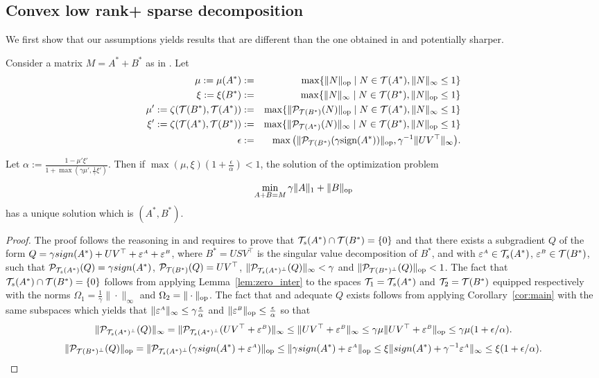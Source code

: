 \documentclass{article}
\begin{document}
\subsection{Convex low rank+ sparse decomposition}
We first show that our assumptions yields results that are different than the one obtained in \citet{chandrasekaran2011rank} and potentially sharper.
\begin{cor}
Consider a matrix $M=A^*+B^*$ as in \citet{chandrasekaran2011rank}. Let 
\begin{eqnarray*}
\mu:=\mu(A^*)&:=&\max \{ \|N\|_{{\rm op}} \mid N \in \mathcal{T}(A^*), \|N\|_{\infty} \leq 1\}\\
 \xi:=\xi(B^*)&:=&\max \{ \|N\|_{\infty} \mid N \in \mathcal{T}(B^*), \|N\|_{{\rm op}} \leq 1 \}\\
\mu':=\zeta(\mathcal{T}(B^*),\mathcal{T}(A^*))&:=&\max \{ \|\mathcal{P}_{\mathcal{T}(B^*)}(N)\|_{{\rm op}} \mid N \in \mathcal{T}(A^*), \|N\|_{\infty} \leq 1\} \\ 
\xi':=\zeta(\mathcal{T}(A^*),\mathcal{T}(B^*))&:=&\max \{ \|\mathcal{P}_{\mathcal{T}(A^*)}(N)\|_{\infty} \mid N \in \mathcal{T}(B^*), \|N\|_{{\rm op}} \leq 1 \}\\
\epsilon&:=&\max \big (\|\mathcal{P}_{\mathcal{T}(B^*)}(\gamma \text{sign}(A^*))\|_{{\rm op}}, \gamma^{-1}\|UV^\top\|_{\infty} \big ).
\end{eqnarray*}

Let $\alpha:=\frac{1-\mu'\xi'}{1+\max(\gamma \mu',\frac{1}{\gamma} \xi')}$. Then if $\max(\mu,\xi) (1+\frac{\epsilon}{\alpha})<1$, the solution of the optimization problem
$$\min_{A+B=M} \gamma \|A\|_{1}+\|B\|_{{\rm op}}$$
has a unique solution which is $(A^*,B^*)$. 
\end{cor}
\begin{proof}
The proof follows the reasoning in \citet{chandrasekaran2011rank} and requires to prove that $\mathcal{T}_s(A^*)\cap \mathcal{T}(B^*)=\{0\}$ and that there exists a subgradient $Q$ of the form $Q=\gamma sign(A^*)+UV^\top+\varepsilon^{{\scriptscriptstyle A}}+\varepsilon^{{\scriptscriptstyle B}}$, where $B^*=USV^\top$
is the singular value decomposition of $B^*$, and with $\varepsilon^{{\scriptscriptstyle A}} \in \mathcal{T}_s(A^*)$,  $\varepsilon^{{\scriptscriptstyle B}} \in \mathcal{T}(B^*)$,
such that $\mathcal{P}_{\mathcal{T}_s(A^*)}(Q)=\gamma sign(A^*)$, $\mathcal{P}_{\mathcal{T}(B^*)}(Q)=UV^\top$, $\|\mathcal{P}_{\mathcal{T}_s(A^*)^\bot}(Q)\|_{\infty} <\gamma$ and  $\|\mathcal{P}_{\mathcal{T}(B^*)^\bot}(Q)\|_{{\rm op}} <1$. The fact that $\mathcal{T}_s(A^*)\cap \mathcal{T}(B^*)=\{0\}$ follows from applying Lemma~\ref{lem:zero_inter} to the spaces $\mathcal{T}_1=\mathcal{T}_s(A^*)$ and $\mathcal{T}_2=\mathcal{T}(B^*)$ equipped respectively with the norms $\Omega_1=\frac{1}{\gamma}\|\cdot\|_{\infty}$ and $\Omega_2=\|\cdot\|_{{\rm op}}$. The fact that and adequate $Q$ exists follows from applying Corollary~\ref{cor:main} with the same subspaces which yields that
$\|\varepsilon^{{\scriptscriptstyle A}}\|_{\infty} \leq \gamma \frac{\epsilon}{\alpha}$ and $\|\varepsilon^{{\scriptscriptstyle B}}\|_{{\rm op}} \leq \frac{\epsilon}{\alpha}$ so that 
$$\|\mathcal{P}_{\mathcal{T}_s(A^*)^\bot}(Q)\|_{\infty}=\|\mathcal{P}_{\mathcal{T}_s(A^*)^\bot}(UV^\top+\varepsilon^{{\scriptscriptstyle B}})\|_{\infty}\leq \|UV^\top+\varepsilon^{{\scriptscriptstyle B}}\|_{\infty} \leq \gamma \mu \|UV^\top+\varepsilon^{{\scriptscriptstyle B}}\|_{{\rm op}} \leq \gamma \mu (1+\epsilon/\alpha).$$
$$\|\mathcal{P}_{\mathcal{T}(B^*)^\bot}(Q)\|_{{\rm op}}=\|\mathcal{P}_{\mathcal{T}_s(A^*)^\bot}(\gamma sign(A^*)+\varepsilon^{{\scriptscriptstyle A}})\|_{{\rm op}}\leq \|\gamma sign(A^*)+\varepsilon^{{\scriptscriptstyle A}}\|_{{\rm op}} \leq \xi \|sign(A^*)+\gamma^{-1}\varepsilon^{{\scriptscriptstyle A}}\|_{\infty} \leq  \xi (1+\epsilon/\alpha).$$
\end{proof}
\end{document}
